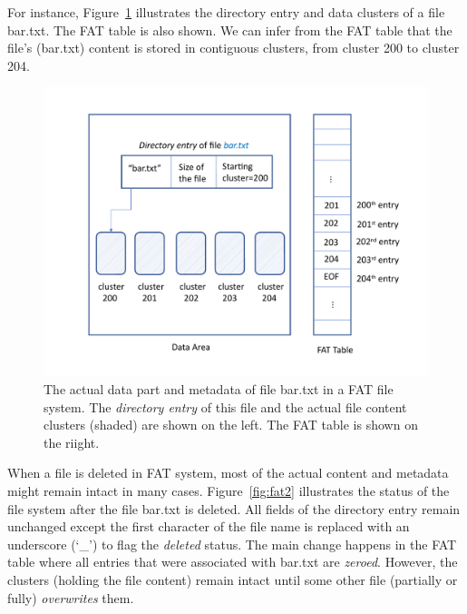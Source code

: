 For instance, Figure~\ref{fig:fat1} illustrates the directory entry and data clusters of 
a file bar.txt. The FAT table is also shown. We can infer from the FAT table that the file's
(bar.txt) content is stored in contiguous clusters, from cluster 200 to cluster 204.


\begin{figure}[h]
     \centering
     \includegraphics[width=\linewidth]{fig/fat1.pdf}
     \caption{The actual data part and metadata of file bar.txt in a FAT file system. The \emph{directory entry} of this file and the actual file content clusters (shaded) are shown on the left. The FAT table is shown on the riight.}
     \label{fig:fat1}
 \end{figure}

When a file is deleted in FAT system, most of the actual content and metadata might 
remain intact in many cases. 
Figure~\ref{fig:fat2} illustrates the status of the file system after the file bar.txt is deleted.
All fields of the directory entry remain unchanged except the first character of the file name 
is replaced with an underscore (`\_') to flag the \emph{deleted} status. The main change happens in the FAT table where all entries
that were associated with bar.txt are \emph{zeroed}. However, the clusters (holding the file content) 
remain intact until some other file (partially or fully) \emph{overwrites} them. 

